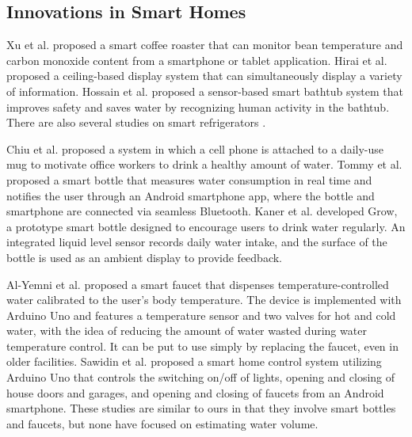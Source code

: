 \documentclass[manuscript,screen,review]{acmart}
\begin{document}
\subsection{Innovations in Smart Homes}
Xu et al. \cite{smart_home1} proposed a smart coffee roaster that can monitor bean temperature and carbon monoxide content from a smartphone or tablet application.
Hirai et al. \cite{smart_home2} proposed a ceiling-based display system that can simultaneously display a variety of information.
Hossain et al. \cite{smart_home3} proposed a sensor-based smart bathtub system that improves safety and saves water by recognizing human activity in the bathtub.
There are also several studies on smart refrigerators \cite{smart_refrigerator1, smart_refrigerator2, smart_refrigerator3, smart_refrigerator4}. \par

Chiu et al. \cite{PlayfulBottle} proposed a system in which a cell phone is attached to a daily-use mug to motivate office workers to drink a healthy amount of water.
Tommy et al. \cite{SmartBottle} proposed a smart bottle that measures water consumption in real time and notifies the user through an Android smartphone app, where the bottle and smartphone are connected via seamless Bluetooth.
Kaner et al. \cite{GROW} developed Grow, a prototype smart bottle designed to encourage users to drink water regularly. An integrated liquid level sensor records daily water intake, and the surface of the bottle is used as an ambient display to provide feedback.\par

Al-Yemni et al. \cite{smart_faucet2} proposed a smart faucet that dispenses temperature-controlled water calibrated to the user’s body temperature. The device is implemented with Arduino Uno and features a temperature sensor and two valves for hot and cold water, with the idea of reducing the amount of water wasted during water temperature control. It can be put to use simply by replacing the faucet, even in older facilities.
Sawidin et al. \cite{smart_faucet3} proposed a smart home control system utilizing Arduino Uno that controls the switching on/off of lights, opening and closing of house doors and garages, and opening and closing of faucets from an Android smartphone.
These studies are similar to ours in that they involve smart bottles and faucets, but none have focused on estimating water volume.


\end{document}
